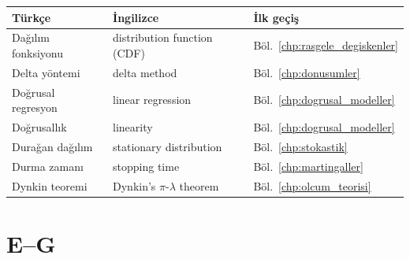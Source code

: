 \begin{tabular}{p{5cm}p{5cm}p{4cm}}
\hline
\textbf{Türkçe} & \textbf{İngilizce} & \textbf{İlk geçiş} \\
\hline
Dağılım fonksiyonu & distribution function (CDF) & Böl.~\ref{chp:rasgele_degiskenler} \\
Delta yöntemi & delta method & Böl.~\ref{chp:donusumler} \\
Doğrusal regresyon & linear regression & Böl.~\ref{chp:dogrusal_modeller} \\
Doğrusallık & linearity & Böl.~\ref{chp:dogrusal_modeller} \\
Durağan dağılım & stationary distribution & Böl.~\ref{chp:stokastik} \\
Durma zamanı & stopping time & Böl.~\ref{chp:martingaller} \\
Dynkin teoremi & Dynkin's $\pi$-$\lambda$ theorem & Böl.~\ref{chp:olcum_teorisi} \\
\hline
\end{tabular}

\section{E--G}

